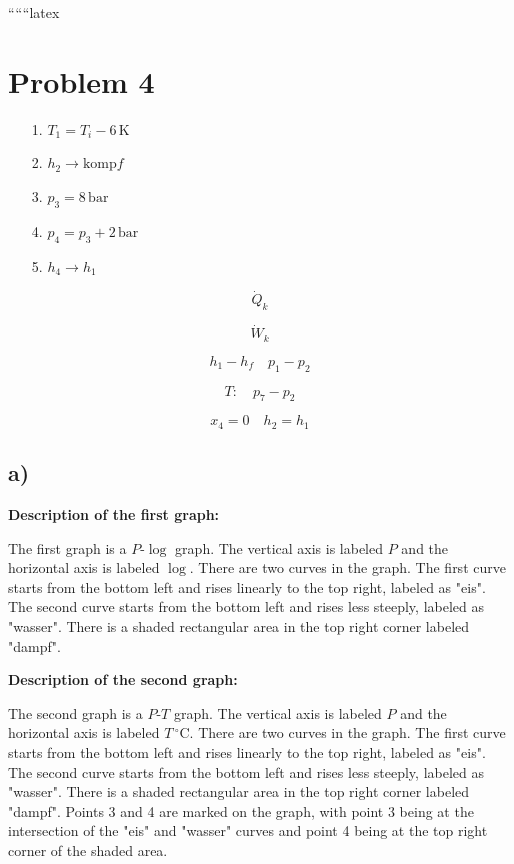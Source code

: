 
``````latex


\section*{Problem 4}

\begin{itemize}
    \item[1.] $T_1 = T_i - 6 \, \text{K}$
    \item[2.] $h_2 \rightarrow \text{komp}f$
    \item[3.] $p_3 = 8 \, \text{bar}$
    \item[4.] $p_4 = p_3 + 2 \, \text{bar}$
    \item[5.] $h_4 \rightarrow h_1$
\end{itemize}

\[
\dot{Q}_k
\]

\[
\dot{W}_k
\]

\[
h_1 - h_f \quad p_1 - p_2
\]

\[
T: \quad p_7 - p_2
\]

\[
x_4 = 0 \quad h_2 = h_1
\]

\subsection*{a)}

\textbf{Description of the first graph:}

The first graph is a $P$-$\log$ graph. The vertical axis is labeled $P$ and the horizontal axis is labeled $\log$. There are two curves in the graph. The first curve starts from the bottom left and rises linearly to the top right, labeled as "eis". The second curve starts from the bottom left and rises less steeply, labeled as "wasser". There is a shaded rectangular area in the top right corner labeled "dampf".

\textbf{Description of the second graph:}

The second graph is a $P$-$T$ graph. The vertical axis is labeled $P$ and the horizontal axis is labeled $T \, ^\circ \text{C}$. There are two curves in the graph. The first curve starts from the bottom left and rises linearly to the top right, labeled as "eis". The second curve starts from the bottom left and rises less steeply, labeled as "wasser". There is a shaded rectangular area in the top right corner labeled "dampf". Points 3 and 4 are marked on the graph, with point 3 being at the intersection of the "eis" and "wasser" curves and point 4 being at the top right corner of the shaded area.

